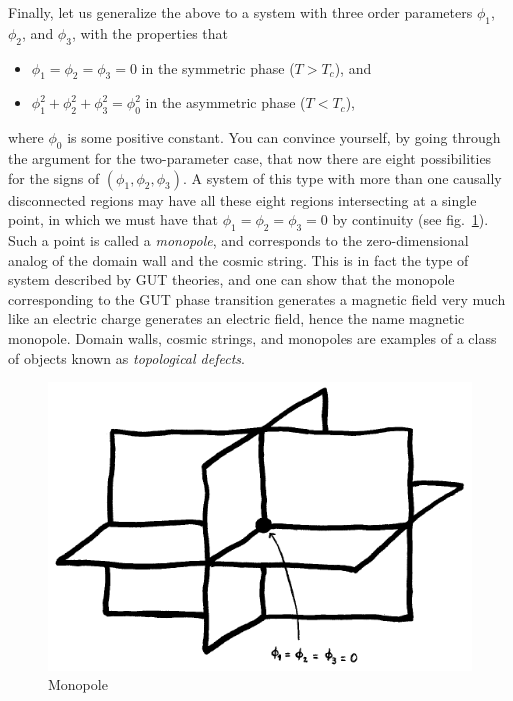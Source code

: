 \documentclass[11pt, a4paper,oneside,openright]{book}
\numberwithin{equation}{section}
\begin{document}
Finally, let us generalize the above to a system with three order parameters $\phi_1$, $\phi_2$, and $\phi_3$, with the properties that
\begin{itemize}
\item [] $\phi_1=\phi_2=\phi_3=0$ in the symmetric phase ($T>T_c$), and
\item [] $\phi_1^2+\phi_2^2+\phi_3^2=\phi_0^2$ in the asymmetric phase ($T<T_c$),
\end{itemize}
where $\phi_0$ is some positive constant. You can convince yourself, by going through the argument for the two-parameter case, that now there are eight possibilities for the signs of $(\phi_1,\phi_2,\phi_3)$. A system of this type with more than one causally disconnected regions may have all these eight regions intersecting at a single point, in which we must have that $\phi_1=\phi_2=\phi_3=0$ by continuity (see fig.\ \ref{fig:lec12_9}). Such a point is called a {\it monopole}, and corresponds to the zero-dimensional analog of the domain wall and the cosmic string. This is in fact the type of system described by GUT theories, and one can show that the monopole corresponding to the GUT phase transition generates a magnetic field very much like an electric charge generates an electric field, hence the name magnetic monopole. Domain walls, cosmic strings, and monopoles are examples of a class of objects known as {\it topological defects}.
\begin{figure}[ht]
\begin{center}
\includegraphics[scale=0.6]{Draw/lec12_9.png}
\end{center}
\caption{Monopole}
\label{fig:lec12_9}
\end{figure}
\end{document}
